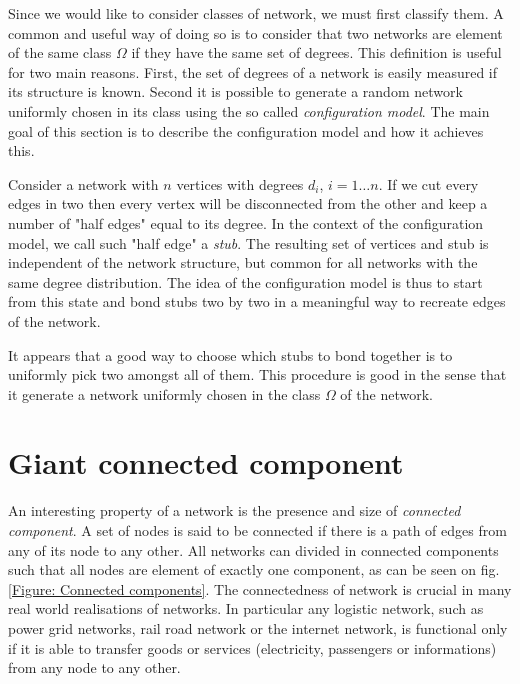 \documentclass[
11pt, %
english, %
singlespacing, %
liststotoc, %
headsepline, %
]{MastersDoctoralThesis} %
\begin{document}
Since we would like to consider classes of network, we must first classify them. A common and useful way of doing so is to consider that two networks are element of the same class $\Omega$ if they have the same set of degrees. This definition is useful for two main reasons. First, the set of degrees of a network is easily measured if its structure is known. Second it is possible to generate a random network uniformly chosen in its class using the so called \emph{configuration model}. The main goal of this section is to describe the configuration model and how it achieves this.

Consider a network with $n$ vertices with degrees $d_i$, $i = 1 \dots n$. If we cut every edges in two then every vertex will be disconnected from the other and keep a number of "half edges" equal to its degree. In the context of the configuration model, we call such "half edge" a \emph{stub}. The resulting set of vertices and stub is independent of the network structure, but common for all networks with the same degree distribution. The idea of the configuration model is thus to start from this state and bond stubs two by two in a meaningful way to recreate edges of the network.

It appears that a good way to choose which stubs to bond together is to uniformly pick two amongst all of them. This procedure is good in the sense that it generate a network uniformly chosen in the class $\Omega$ of the network.


\section{Giant connected component}

An interesting property of a network is the presence and size of \emph{connected component}. A set of nodes is said to be connected if there is a path of edges from any of its node to any other. All networks can divided in connected components such that all nodes are element of exactly one component, as can be seen on fig. \ref{Figure: Connected components}. The connectedness of network is crucial in many real world realisations of networks. In particular any logistic network, such as power grid networks, rail road network or the internet network, is functional only if it is able to transfer goods or services (electricity, passengers or informations) from any node to any other.
\end{document}
